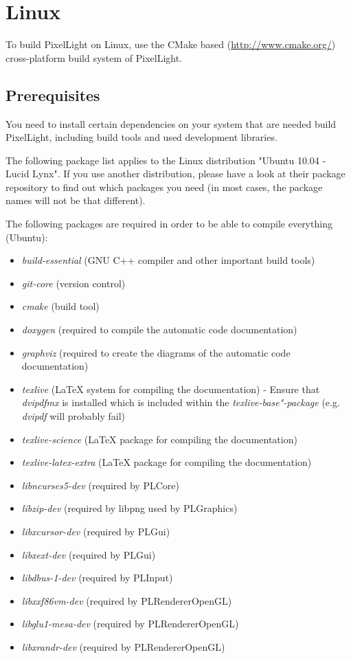 \chapter{Linux}
To build PixelLight on Linux, use the CMake based (\url{http://www.cmake.org/}) cross-platform build system of PixelLight.




\section{Prerequisites}
You need to install certain dependencies on your system that are needed build PixelLight, including build tools and used development libraries.

The following package list applies to the Linux distribution "Ubuntu 10.04 - Lucid Lynx". If you use another distribution, please have a look at their package repository to find out which packages you need (in most cases, the package names will not be that different).

The following packages are required in order to be able to compile everything (Ubuntu):
\begin{itemize}
\item{\emph{build-essential} (GNU C++ compiler and other important build tools)}
\item{\emph{git-core} (version control)}
\item{\emph{cmake} (build tool)}
\item{\emph{doxygen} (required to compile the automatic code documentation)}
\item{\emph{graphviz} (required to create the diagrams of the automatic code documentation)}
\item{\emph{texlive} (\LaTeX{} system for compiling the documentation) - Ensure that \emph{dvipdfmx} is installed which is included within the \emph{texlive-base"-package} (e.g. \emph{dvipdf} will probably fail)}
\item{\emph{texlive-science} (\LaTeX{} package for compiling the documentation)}
\item{\emph{texlive-latex-extra} (\LaTeX{} package for compiling the documentation)}
\item{\emph{libncurses5-dev} (required by PLCore)}
\item{\emph{libzip-dev} (required by libpng used by PLGraphics)}
\item{\emph{libxcursor-dev} (required by PLGui)}
\item{\emph{libxext-dev} (required by PLGui)}
\item{\emph{libdbus-1-dev} (required by PLInput)}
\item{\emph{libxxf86vm-dev} (required by PLRendererOpenGL)}
\item{\emph{libglu1-mesa-dev} (required by PLRendererOpenGL)}
\item{\emph{libxrandr-dev} (required by PLRendererOpenGL)}
\end{itemize}

